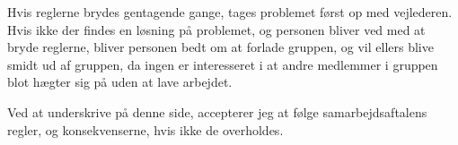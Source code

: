 \documentclass[hidelinks, 12pt]{article}
\begin{document}
	Hvis reglerne brydes gentagende gange, tages problemet først op med vejlederen. Hvis ikke der findes en løsning på problemet, og personen bliver ved med at bryde reglerne, bliver personen bedt om at forlade gruppen, og vil ellers blive smidt ud af gruppen, da ingen er interesseret i at andre medlemmer i gruppen blot hægter sig på uden at lave arbejdet.

	Ved at underskrive på denne side, accepterer jeg at følge samarbejdsaftalens regler, og konsekvenserne, hvis ikke de overholdes.
	
\begin{table}[b]
\centering
\label{my-label}
\end{table}
\end{document}
